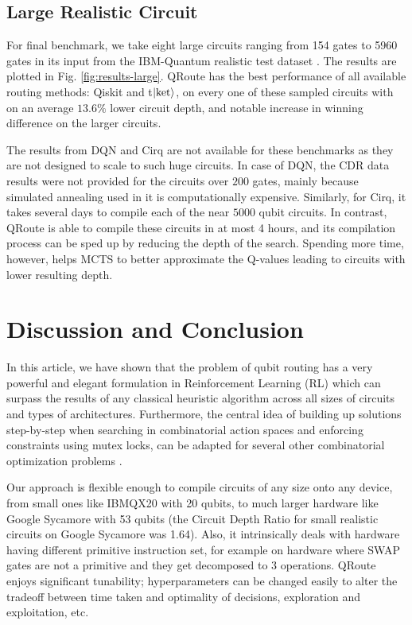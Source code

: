 \documentclass[%
 reprint,
amsmath,amssymb,showkeys,
pra,
]{revtex4-2}
\begin{document}
\subsection{\label{sec:results-realistic}Large Realistic Circuit}

For final benchmark, we take eight large circuits ranging from 154 gates to 5960 gates in its input from the IBM-Quantum realistic test dataset \citep{data_realistic}. The results are plotted in Fig.  \ref{fig:results-large}. QRoute has the best performance of all available routing methods: Qiskit and t$\ket{\text{ket}}$, on every one of these sampled circuits with on an average $13.6\%$ lower circuit depth, and notable increase in winning difference on the larger circuits.

The results from DQN and Cirq are not available for these benchmarks as they are not designed to scale to such huge circuits. In case of DQN, the CDR data results were not provided for the circuits over $200$ gates, mainly because simulated annealing used in it is computationally expensive. Similarly, for Cirq, it takes several days to compile each of the near $5000$ qubit circuits. In contrast, QRoute is able to compile these circuits in at most 4 hours, and its compilation process can be sped up by reducing the depth of the search. Spending more time, however, helps MCTS to better approximate the Q-values leading to circuits with lower resulting depth.

\section{\label{sec:discussion-conclusion}Discussion and Conclusion}

In this article, we have shown that the problem of qubit routing has a very powerful and elegant formulation in Reinforcement Learning (RL) which can surpass the results of any classical heuristic algorithm across all sizes of circuits and types of architectures. Furthermore, the central idea of building up solutions step-by-step when searching in combinatorial action spaces and enforcing constraints using mutex locks, can be adapted for several other combinatorial optimization problems \citep{comb_survey, comb_1, comb_2, comb_3, comb_4}.

Our approach is flexible enough to compile circuits of any size onto any device, from small ones like IBMQX20 with 20 qubits, to much larger hardware like Google Sycamore with 53 qubits (the Circuit Depth Ratio for small realistic circuits on Google Sycamore was 1.64). Also, it intrinsically deals with hardware having different primitive instruction set, for example on hardware where SWAP gates are not a primitive and they get decomposed to 3 operations. QRoute enjoys significant tunability; hyperparameters can be changed easily to alter the tradeoff between time taken and optimality of decisions, exploration and exploitation, etc.
\end{document}
